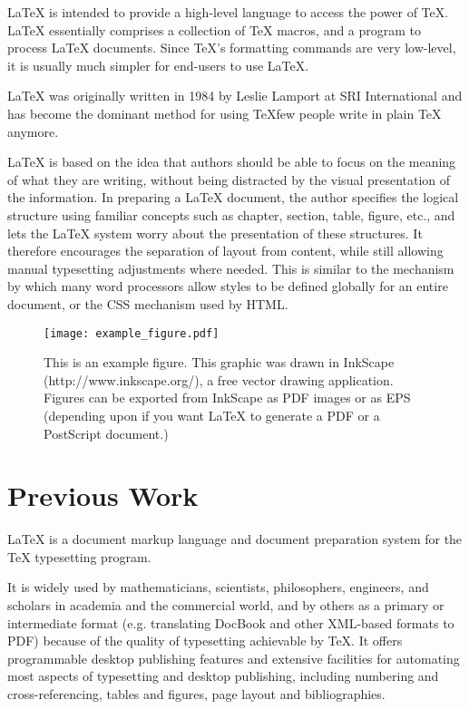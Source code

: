 \documentclass[12pt]{ucthesis}
\newcommand{\captionfonts}{\small\bf\ssp}
\begin{document}
LaTeX is intended to provide a high-level language to access the power of TeX. LaTeX essentially comprises a collection of TeX macros, and a program to process LaTeX documents. Since TeX's formatting commands are very low-level, it is usually much simpler for end-users to use LaTeX.

LaTeX was originally written in 1984 by Leslie Lamport at SRI International and has become the dominant method for using TeXfew people write in plain TeX anymore.

LaTeX is based on the idea that authors should be able to focus on the meaning of what they are writing, without being distracted by the visual presentation of the information. In preparing a LaTeX document, the author specifies the logical structure using familiar concepts such as chapter, section, table, figure, etc., and lets the LaTeX system worry about the presentation of these structures. It therefore encourages the separation of layout from content, while still allowing manual typesetting adjustments where needed. This is similar to the mechanism by which many word processors allow styles to be defined globally for an entire document, or the CSS mechanism used by HTML.


\begin{figure}
\begin{center}
\texttt{[image: example\_figure.pdf]}
\captionfonts
\caption[This is a figure]{This is an example figure.  This graphic was drawn in InkScape (http://www.inkscape.org/), a free vector drawing application.  Figures can be exported from InkScape as PDF images or as EPS (depending upon if you want LaTeX to generate a PDF or a PostScript document.)}
\label{fig:inkscape-example}
\end{center}
\end{figure}



\chapter{Previous Work}
\label{previous-work}

LaTeX is a document markup language and document preparation system for the TeX typesetting program.

It is widely used by mathematicians, scientists, philosophers, engineers, and scholars in academia and the commercial world, and by others as a primary or intermediate format (e.g. translating DocBook and other XML-based formats to PDF) because of the quality of typesetting achievable by TeX. It offers programmable desktop publishing features and extensive facilities for automating most aspects of typesetting and desktop publishing, including numbering and cross-referencing, tables and figures, page layout and bibliographies.
\end{document}
